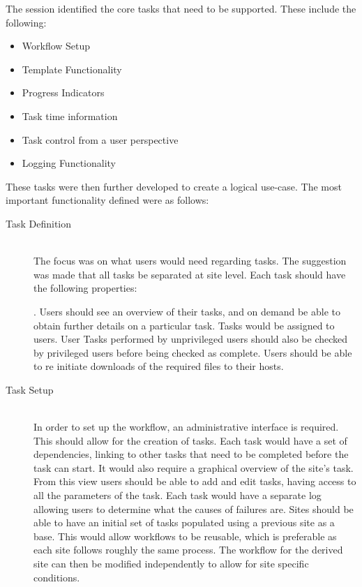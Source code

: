 \documentclass[12pt,a4paper]{report}
\begin{document}
The session identified the core tasks that need to be supported. These
include the following:
\begin{itemize}
    \item Workflow Setup
    \item Template Functionality
    \item Progress Indicators
    \item Task time information
    \item Task control from a user perspective
    \item Logging Functionality
\end{itemize}
These tasks were then further developed to create a logical use-case. The
most important functionality defined were as follows:
\begin{description}
    \item[Task Definition] \hfill \\
        The focus was on what users would need regarding tasks.
        The suggestion was made that all tasks be separated at site level.
        Each task should have the following properties:.
        Users should see an overview of their tasks, and on demand be able to
	obtain
        further details on a particular task. Tasks would be assigned to users.
        User Tasks performed by unprivileged users should also be checked by
        privileged users before being checked as complete. Users should be
        able to re initiate downloads of the required files to their hosts.

    \item[Task Setup] \hfill \\
        In order to set up the workflow, an administrative interface is required.
        This should allow for the creation of tasks. Each task would have a set
        of dependencies, linking to other tasks that need to be completed before
        the task can start. It would also require a graphical overview of the
        site's task. From this view users should be able to add and edit tasks,
        having access to all the parameters of the task. Each task would have
        a separate log allowing users to determine what the causes of failures are.
	Sites should be able to have an initial set of tasks populated using a
	previous site as a base. This would allow workflows to be reusable, which
        is preferable as each site follows roughly the same process. The
	workflow for the derived site can then be modified independently to
	allow for site specific conditions.
\end{description}
\end{document}
